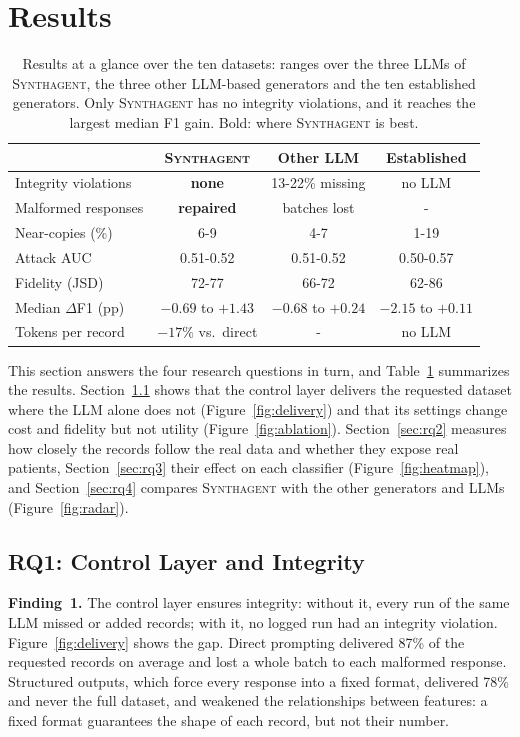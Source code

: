 \documentclass[conference]{IEEEtran}
\newcommand{\system}{\textsc{Synthagent}\xspace}
\newcommand{\best}[1]{\textbf{\boldmath #1}}
\begin{document}
\section{Results}
\label{sec:results}
\begin{table}[t]
\centering
\caption{Results at a glance over the ten datasets: ranges over the three LLMs of \system, the three other LLM-based generators and the ten established generators. Only \system has no integrity violations, and it reaches the largest median F1 gain. Bold: where \system is best.}
\label{tab:glance}
\scriptsize
\setlength{\tabcolsep}{1.5pt}
\begin{tabular*}{\columnwidth}{@{\extracolsep{\fill}}lccc@{}}
\toprule
& \system & Other LLM & Established \\
\midrule
Integrity violations & \best{none} & 13-22\% missing & no LLM \\
Malformed responses & \best{repaired} & batches lost & - \\
Near-copies (\%) & 6-9 & 4-7 & 1-19 \\
Attack AUC & 0.51-0.52 & 0.51-0.52 & 0.50-0.57 \\
Fidelity (JSD) & 72-77 & 66-72 & 62-86 \\
Median $\Delta$F1 (pp) & $-0.69$ to \best{$+1.43$} & $-0.68$ to $+0.24$ & $-2.15$ to $+0.11$ \\
Tokens per record & \best{$-17\%$} vs.\ direct & - & no LLM \\
\bottomrule
\end{tabular*}
\end{table}
This section answers the four research questions in turn, and Table~\ref{tab:glance} summarizes the results. Section~\ref{sec:rq1} shows that the control layer delivers the requested dataset where the LLM alone does not (Figure~\ref{fig:delivery}) and that its settings change cost and fidelity but not utility (Figure~\ref{fig:ablation}). Section~\ref{sec:rq2} measures how closely the records follow the real data and whether they expose real patients, Section~\ref{sec:rq3} their effect on each classifier (Figure~\ref{fig:heatmap}), and Section~\ref{sec:rq4} compares \system with the other generators and LLMs (Figure~\ref{fig:radar}).
\subsection{RQ1: Control Layer and Integrity}
\label{sec:rq1}
\textbf{Finding~1.} The control layer ensures integrity: without it, every run of the same LLM missed or added records; with it, no logged run had an integrity violation. Figure~\ref{fig:delivery} shows the gap. Direct prompting delivered 87\% of the requested records on average and lost a whole batch to each malformed response. Structured outputs, which force every response into a fixed format, delivered 78\% and never the full dataset, and weakened the relationships between features: a fixed format guarantees the shape of each record, but not their number.
\end{document}
